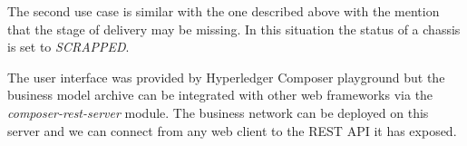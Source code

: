 The second use case is similar with the one described above with the mention that the stage of delivery may be missing. In this situation the status of a chassis is set to \emph{SCRAPPED}.

The user interface was provided by Hyperledger Composer playground but the business model archive can be integrated with other web frameworks via the \emph{composer-rest-server} module. The business network can be deployed on this server and we can connect from any web client to the REST API it has exposed.

